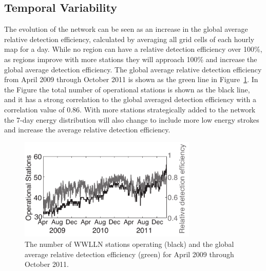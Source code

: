 
\subsection{Temporal Variability}

The evolution of the network can be seen as an increase in the global average relative detection efficiency, calculated by averaging all grid cells of each hourly map for a day.
While no region can have a relative detection efficiency over 100\%, as regions improve with more stations they will approach 100\% and increase the global average detection efficiency.
The global average relative detection efficiency from April 2009 through October 2011 is shown as the green line in Figure~\ref{efficiency:fig:DE_Evolution}.
In the Figure the total number of operational stations is shown as the black line, and it has a strong correlation to the global averaged detection efficiency with a correlation value of 0.86.
With more stations strategically added to the network the 7-day energy distribution will also change to include more low energy strokes and increase the average relative detection efficiency.


\begin{figure}[ht!]
   \centering
\noindent\includegraphics[width=20pc]{efficiency/Figures/2012RS005049-p9.pdf}
   \caption{The number of WWLLN stations operating (black) and the global average relative detection efficiency (green) for April 2009 through October 2011.}
   \label{efficiency:fig:DE_Evolution}
\end{figure}

